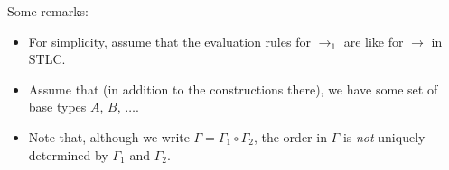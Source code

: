 \begin{minipage}{\textwidth}
  \begin{minipage}{0.35\textwidth}
    \begin{prooftree}
    \end{prooftree}
    \hfill
  \end{minipage}
  \hfill
  \begin{minipage}{0.5\textwidth}
    \begin{prooftree}
    \end{prooftree}
  \end{minipage}
  \vspace{1em}
\end{minipage}

\begin{prooftree}
\end{prooftree}
\begin{prooftree}
\end{prooftree}
Some remarks:
\begin{itemize}
  \item For simplicity, assume that the evaluation rules for $\rightarrow_1$ are like for $\rightarrow$ in STLC.
  \item Assume that (in addition to the constructions there), we have some set of base types $A$, $B$, $\dots$.
  \item Note that, although we write \(\Gamma = \Gamma_1\circ\Gamma_2\), the order in \(\Gamma\) is \emph{not}
    uniquely determined by \(\Gamma_1\) and \(\Gamma_2\).
\end{itemize}


